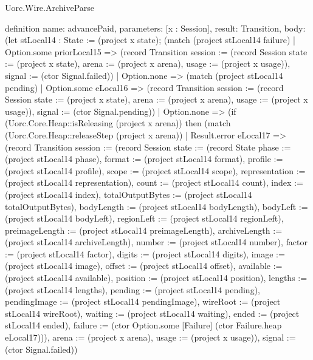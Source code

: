 \begin{lexlean}{Uorc.Wire.ArchiveParse}
\begin{semanticmodule}
definition{
  name: advancePaid,
  parameters: [x : Session],
  result: Transition,
  body: (let stLocal14 : State := (project x state); (match (project stLocal14 failure)
    | Option.some priorLocal15 => (record Transition {session := (record Session {state := (project x state), arena := (project x arena), usage := (project x usage)}), signal := (ctor Signal.failed)})
    | Option.none => (match (project stLocal14 pending)
      | Option.some eLocal16 => (record Transition {session := (record Session {state := (project x state), arena := (project x arena), usage := (project x usage)}), signal := (ctor Signal.pending)})
      | Option.none => (if (Uorc.Core.Heap::isReleasing (project x arena)) then (match (Uorc.Core.Heap::releaseStep (project x arena))
        | Result.error eLocal17 => (record Transition {session := (record Session {state := (record State {phase := (project stLocal14 phase), format := (project stLocal14 format), profile := (project stLocal14 profile), scope := (project stLocal14 scope), representation := (project stLocal14 representation), count := (project stLocal14 count), index := (project stLocal14 index), totalOutputBytes := (project stLocal14 totalOutputBytes), bodyLength := (project stLocal14 bodyLength), bodyLeft := (project stLocal14 bodyLeft), regionLeft := (project stLocal14 regionLeft), preimageLength := (project stLocal14 preimageLength), archiveLength := (project stLocal14 archiveLength), number := (project stLocal14 number), factor := (project stLocal14 factor), digits := (project stLocal14 digits), image := (project stLocal14 image), offset := (project stLocal14 offset), available := (project stLocal14 available), position := (project stLocal14 position), lengths := (project stLocal14 lengths), pending := (project stLocal14 pending), pendingImage := (project stLocal14 pendingImage), wireRoot := (project stLocal14 wireRoot), waiting := (project stLocal14 waiting), ended := (project stLocal14 ended), failure := (ctor Option.some [Failure] (ctor Failure.heap eLocal17))}), arena := (project x arena), usage := (project x usage)}), signal := (ctor Signal.failed)})
}
\end{semanticmodule}
\end{lexlean}
